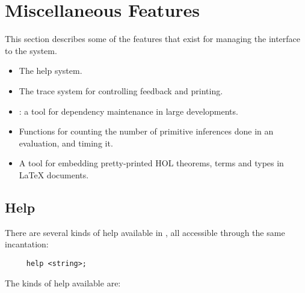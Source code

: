 \chapter{Miscellaneous Features}

This section describes some of the features
that exist for managing the interface
%
%
to the \HOL{} system.

\begin{itemize}
\item The help system.
\item The trace system for controlling feedback and printing.
\item \holmake{}: a tool for dependency maintenance in large developments.
\item Functions for counting the number of primitive inferences done in
an evaluation, and timing it.
\item A tool for embedding pretty-printed HOL theorems, terms and
  types in \LaTeX{} documents.
\end{itemize}

\section{Help}

 There are several kinds of help available in \HOL{}, all accessible
 through the same incantation:
 \begin{verbatim}
     help <string>;
 \end{verbatim}

 The kinds of help available are:

